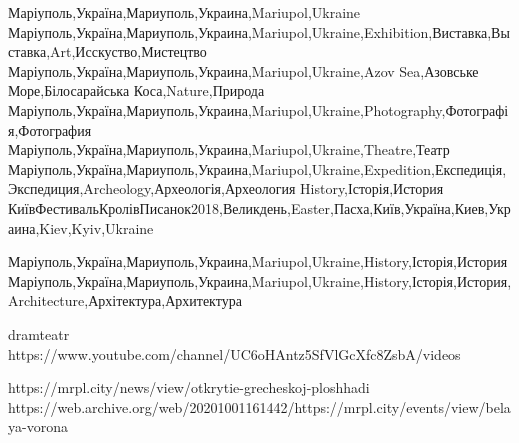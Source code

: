 Маріуполь,Україна,Мариуполь,Украина,Mariupol,Ukraine
Маріуполь,Україна,Мариуполь,Украина,Mariupol,Ukraine,Exhibition,Виставка,Выставка,Art,Исскуство,Мистецтво
Маріуполь,Україна,Мариуполь,Украина,Mariupol,Ukraine,Azov Sea,Азовське Море,Білосарайська Коса,Nature,Природа
Маріуполь,Україна,Мариуполь,Украина,Mariupol,Ukraine,Photography,Фотографія,Фотография
Маріуполь,Україна,Мариуполь,Украина,Mariupol,Ukraine,Theatre,Театр
Маріуполь,Україна,Мариуполь,Украина,Mariupol,Ukraine,Expedition,Експедиція,Экспедиция,Archeology,Археологія,Археология
History,Історія,История
КиївФестивальКролівПисанок2018,Великдень,Easter,Пасха,Київ,Україна,Киев,Украина,Kiev,Kyiv,Ukraine

Маріуполь,Україна,Мариуполь,Украина,Mariupol,Ukraine,History,Історія,История
Маріуполь,Україна,Мариуполь,Украина,Mariupol,Ukraine,History,Історія,История,Architecture,Архітектура,Архитектура

dramteatr
https://www.youtube.com/channel/UC6oHAntz5SfVlGcXfc8ZsbA/videos

https://mrpl.city/news/view/otkrytie-grecheskoj-ploshhadi
https://web.archive.org/web/20201001161442/https://mrpl.city/events/view/belaya-vorona


